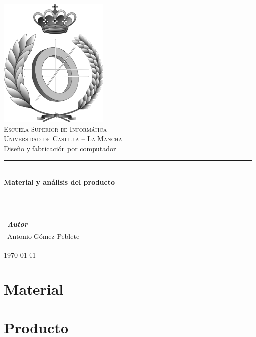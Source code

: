 \documentclass[a4paper,11pt,oneside]{report}
\begin{document}
\pagestyle{plain}



\begin{titlepage}
\begin{center}

\includegraphics[width=0.4\textwidth]{esi_bw.png}\\[1cm]
\textsc{\LARGE Escuela Superior de Informática}\\[0.5cm]
\textsc{\Large Universidad de Castilla -- La Mancha}\\[2.5cm]

{\LARGE Diseño y fabricación por computador}\\[0.5cm]
\rule{\linewidth}{0.5mm}\\[0.4cm]
{\huge \textbf{Material y análisis del producto}}\\[0.4cm]
\rule{\linewidth}{0.5mm}\\[1.5cm]


{\large
\begin{tabular}{l}
\hspace{1cm}\textbf{\emph{Autor}}\\
Antonio Gómez Poblete \\
\end{tabular}
}
\vfill

{\large \today}\\[0.5cm]

\end{center}
\end{titlepage}


\clearpage
{}

\tableofcontents
{}

\clearpage

\pagestyle{fancy}

\chapter{Material}


\chapter{Producto}

\end{document}
